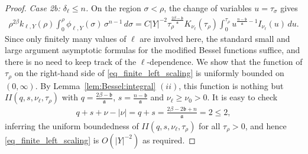 \documentclass[10pt,a4paper]{amsart}
\begin{document}
\begin{proof}
\textit{Case 2b: $\delta_\ell \le n$.} On the region $\sigma<\rho$, the change of variables $u=\tau_\sigma$ gives
\begin{align}\label{eq_finite_left_scaling}
\rho^{2\beta}
    k_{\ell,Y}(\rho)
    \int_0^\rho
        \phi_{\ell,Y}(\sigma) \, \sigma^{n-1} \, d\sigma
    =
    C |Y|^{-2}
    \tau_\rho^{\frac{2\beta-\mathfrak b}{\mathfrak a}}
    K_{\nu_\ell}(\tau_\rho)
    \int_0^{\tau_\rho}
        u^{\frac{n-\mathfrak b}{\mathfrak a}-1}
        I_{\nu_\ell}(u) \, du.
\end{align}
Since only finitely many values of $\ell$ are involved here, the standard small and large argument asymptotic formulas for the modified Bessel functions suffice, and there is no need to keep track of the $\ell$-dependence. We show that the function of $\tau_\rho$ on the right-hand side of \eqref{eq_finite_left_scaling} is uniformly bounded on $(0,\infty)$. By Lemma~\ref{lem:Bessel:integral} $(ii)$, this function is nothing but $II(q,s,\nu_\ell,\tau_\rho)$ with $q=\frac{2\beta-\mathfrak b}{\mathfrak a}$, $s=\frac{n-\mathfrak b}{\mathfrak a}$ and $\nu_\ell \ge \nu_0>0$. It is easy to check 
\begin{align}\label{check}
    q+s+\nu-|\nu| = q+s = \frac{2\beta - 2\mathfrak b+n}{\mathfrak a} = 2 \le 2,
\end{align}
inferring the uniform boundedness of $II(q,s,\nu_\ell,\tau_\rho)$ for all $\tau_\rho >0$, and hence \eqref{eq_finite_left_scaling} is $O(|Y|^{-2})$ as required.


\end{proof}
\end{document}

